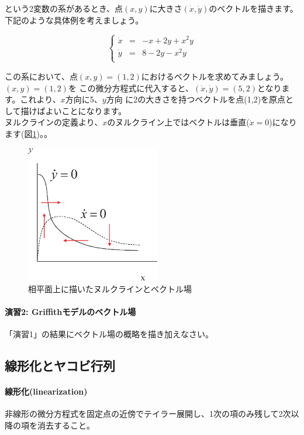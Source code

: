 という2変数の系があるとき、点\((x,y)\)に大きさ\((\dot x , \dot y)\)のベクトルを描きます。
下記のような具体例を考えましょう。

\[
\left\{
\begin{array}{lclclll}
\dot x & = & -x + 2y + x^2y\\
\dot y & = & 8 -2y -x^2y\\
\end{array}
\right.\]

この系において、点\((x,y)=(1,2)\)におけるベクトルを求めてみましょう。\((x,y)=(1,2)\)を
この微分方程式に代入すると、\((\dot x, \dot y)=(5,2)\)となります。これより、\(x\)方向に5、\(y\)方向
に2の大きさを持つベクトルを点(1,2)を原点として描けばよいことになります。\\

\indent ヌルクラインの定義より、\(x\)のヌルクライン上ではベクトルは垂直(\(\dot x = 0\))になります(図\ref{fig:05sysbio})。。

\begin{figure}[ht]
        \centering \includegraphics[height=6cm]{../Bifurcation/img/vectorfield.eps}
        \caption{相平面上に描いたヌルクラインとベクトル場}
        \label{fig:05sysbio} \end{figure}


\paragraph{演習2:  Griffithモデルのベクトル場}
「演習1」の結果にベクトル場の概略を描き加えなさい。


\subsection{線形化とヤコビ行列}
\paragraph{線形化(linearization)}
非線形の微分方程式を固定点の近傍でテイラー展開し、1次の項のみ残して2次以降の項を消去すること。

